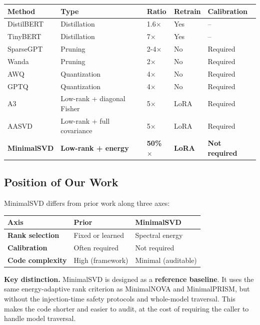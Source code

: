 \begin{table}[H]
\centering
\small
\begin{tabular}{lllll}
\toprule
\textbf{Method} & \textbf{Type} & \textbf{Ratio} & \textbf{Retrain} & \textbf{Calibration} \\
\midrule
DistilBERT & Distillation & 1.6$\times$ & Yes & -- \\
TinyBERT & Distillation & 7$\times$ & Yes & -- \\
SparseGPT & Pruning & 2-4$\times$ & No & Required \\
Wanda & Pruning & 2$\times$ & No & Required \\
AWQ & Quantization & 4$\times$ & No & Required \\
GPTQ & Quantization & 4$\times$ & No & Required \\
A3 & Low-rank + diagonal Fisher & 5$\times$ & LoRA & Required \\
AASVD & Low-rank + full covariance & 5$\times$ & LoRA & Required \\
\textbf{MinimalSVD} & \textbf{Low-rank + energy} & \textbf{50\%$\times$} & \textbf{LoRA} & \textbf{Not required} \\
\bottomrule
\end{tabular}
\end{table}

\subsection{Position of Our Work}

MinimalSVD differs from prior work along three axes:

\begin{table}[H]
\centering
\small
\begin{tabular}{lll}
\toprule
\textbf{Axis} & \textbf{Prior} & \textbf{MinimalSVD} \\
\midrule
\textbf{Rank selection} & Fixed or learned & Spectral energy \\
\textbf{Calibration} & Often required & Not required \\
\textbf{Code complexity} & High (framework) & Minimal (auditable) \\
\bottomrule
\end{tabular}
\end{table}

\textbf{Key distinction.} MinimalSVD is designed as a \textbf{reference baseline}. It 
uses the same energy-adaptive rank criterion as MinimalNOVA and MinimalPRISM, 
but without the injection-time safety protocols and whole-model traversal. 
This makes the code shorter and easier to audit, at the cost of requiring 
the caller to handle model traversal.



